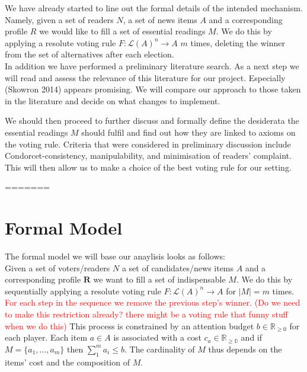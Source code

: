 \documentclass[10pt,a4paper, english]{article}
\begin{document}
We have already started to line out the formal details of the intended mechanism. Namely, given a set of readers $N$, a set of news items $A$ and a corresponding profile $R$ we would like to fill a set of essential readings $M$. We do this by applying a resolute voting rule $F:\mathcal{L}(A)^n \rightarrow A$ $m$ times, deleting the winner from the set of alternatives after each election.\\

In addition we have performed a preliminary literature search. As a next step we will read and assess the relevance of this literature for our project. Especially (Skowron 2014) appears promising. We will compare our approach to those taken in the literature and decide on what changes to implement.

We should then proceed to further discuss and formally define the desiderata the essential readings $M$ should fulfil and find out how they are linked to axioms on the voting rule. Criteria that were considered in preliminary discussion include Condorcet-consistency, manipulability, and minimisation of readers' complaint. This will then allow us to make a choice of the best voting rule for our setting.

=======
\section{Formal Model}
The formal model we will base our anaylisis looks as follows:\\
Given a set of voters/readers $N$ a set of candidates/news items $A$ and a corresponding profile $\mathbf{R}$ we want to fill a set of indispensable $M$. We do this by sequentially applying a resolute voting rule $F:\mathcal{L}(A)^n \rightarrow A$ for $|M|=m$ times. \textcolor{red}{For each step in the sequence we remove the previous step's winner. (Do we need to make this restriction already? there might be a voting rule that funny stuff when we do this)} This process is constrained by an attention budget $b\in \mathbb{R}_{\geq 0}$ for each player. Each item $a\in A$ is associated with a cost $c_a\in \mathbb{R_{\geq 0}}$ and if $M=\{a_1, \dots ,a_m\}$ then $\sum_1^m a_i \leq b$. The cardinality of $M$ thus depends on the items' cost and the composition of $M$.
\end{document}
